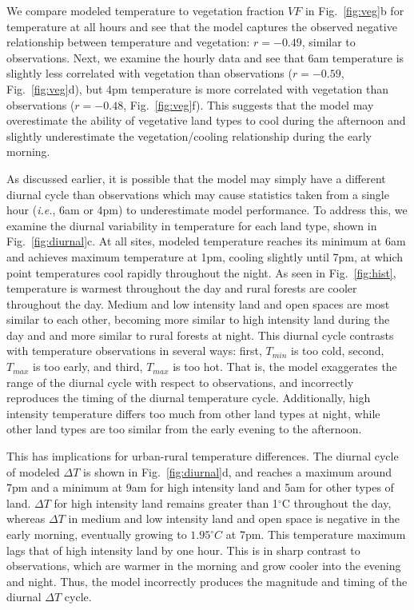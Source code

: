 \documentclass[draft,linenumbers]{agujournal}
\begin{document}
We compare modeled temperature to vegetation fraction $VF$ in Fig.~\ref{fig:veg}b for temperature at all hours and see that
the model captures the observed negative relationship between temperature and vegetation: $r= -0.49$, similar to observations. Next, we examine the hourly data and see that 6am temperature is slightly less correlated with vegetation than observations ($r= -0.59$, Fig.~\ref{fig:veg}d), but 4pm temperature is more correlated with vegetation than observations ($r= -0.48$, Fig.~\ref{fig:veg}f). This suggests that the model may overestimate the ability of vegetative land types to cool during the afternoon and slightly underestimate the vegetation/cooling relationship during the early morning. 

As discussed earlier, it is possible that the model may simply have a different diurnal cycle than observations which may cause statistics taken from a single hour (\textit{i.e.}, 6am or 4pm) to underestimate model performance. To address this, we examine the diurnal variability in temperature for each land type, shown in Fig.~\ref{fig:diurnal}c. At all sites, modeled temperature reaches its minimum at 6am and achieves maximum temperature at 1pm, cooling slightly until  7pm, at which point temperatures cool rapidly throughout the night. As seen in Fig.~\ref{fig:hist}, 
temperature is warmest throughout the day and rural forests are cooler throughout the day. Medium and low intensity land and open spaces are most similar to each other, becoming more similar to high intensity land during the day and and more similar to rural forests at night. 
This diurnal cycle contrasts with temperature observations in several ways: first, $T_{min}$ is too cold, second, $T_{max}$ is too early, and third, $T_{max}$ is too hot. That is, the model exaggerates the range of the diurnal cycle with respect to observations, and incorrectly reproduces the timing of the diurnal temperature cycle. Additionally, high intensity temperature differs too much from other land types at night, while other land types are too similar from the early evening to the afternoon. 
 
 This has implications for urban-rural temperature differences. The diurnal cycle of modeled $\Delta T$ is shown in Fig.~\ref{fig:diurnal}d, and reaches a maximum around 7pm and a minimum at 9am for high intensity land and 5am for other types of land. $\Delta T$ for high intensity land remains greater than 1$^\circ$C throughout the day, whereas $\Delta T$ in medium and low intensity land and open space is negative in the early morning, eventually growing to $1.95^\circ C$ at 7pm. This temperature maximum lags that of high intensity land by one hour. This is in sharp contrast to observations, which are warmer in the morning and grow cooler into the evening and night. Thus, the model incorrectly produces the magnitude and timing of the diurnal $\Delta T$ cycle. %
 
\end{document}
